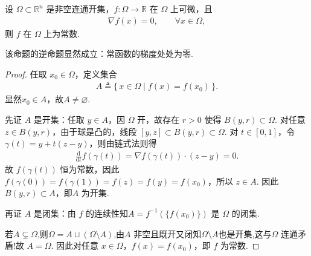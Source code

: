 \documentclass[../../main.tex]{subfiles}%
\begin{document}
\begin{proposition}\label{proposition:连通开集上梯度为0就是常数}
设 $\Omega\subset \mathbb{R}^n$ 是非空连通开集，$f:\Omega\to\mathbb{R}$ 在 $\Omega$ 上可微，且
\begin{align*}
\nabla f(x)=0,\qquad \forall x\in\Omega,
\end{align*}
则 $f$ 在 $\Omega$ 上为常数.
\end{proposition}
\begin{remark}
该命题的逆命题显然成立：常函数的梯度处处为零.
\end{remark}
\begin{proof}

任取 $x_0\in\Omega$，定义集合
\begin{align*}
A\triangleq\{\,x\in\Omega\mid f(x)=f(x_0)\,\}.
\end{align*}
显然$x_0\in A$，故$A\neq\varnothing$.

先证 $A$ 是开集：任取 $y\in A$，因 $\Omega$ 开，故存在 $r>0$ 使得 $B(y,r)\subset\Omega$. 对任意 $z\in B(y,r)$，由于球是凸的，线段 $[y,z]\subset B(y,r)\subset\Omega$. 对 $t\in[0,1]$，令 $\gamma(t)=y+t(z-y)$，则由链式法则得
\begin{align*}
\frac{\mathrm{d}}{\mathrm{d}t} f(\gamma(t))=\nabla f(\gamma(t))\cdot(z-y)=0.
\end{align*}
故 $f(\gamma(t))$ 恒为常数，因此$f(\gamma(0))=f(\gamma(1))=f(z)=f(y)=f(x_0)$，所以 $z\in A$. 因此 $B(y,r)\subset A$，即$A$ 为开集.

再证 $A$ 是闭集：由 $f$ 的连续性知$A=f^{-1}(\{f(x_0)\})$ 是 $\Omega$ 的闭集.

若$A \subsetneq  \Omega$,则$\Omega =A\sqcup (\Omega\setminus A)$,由$A$ 非空且既开又闭知$\Omega\setminus A$也是开集,这与$\Omega$ 连通矛盾!故 $A=\Omega$. 因此对任意 $x\in\Omega$，$f(x)=f(x_0)$，即 $f$ 为常数.
\end{proof}
\end{document}
